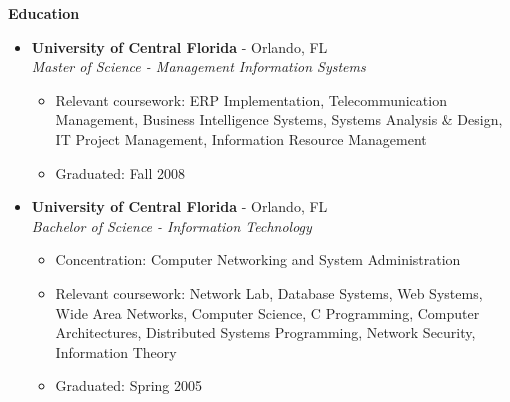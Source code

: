 \documentclass[10pt,oneside]{article}
\newenvironment{ressection}[1]{
	\vspace{4pt}
	\textbf{\selectfont\normalsize#1}
	\begin{itemize}
	\vspace{3pt}
}{
	\end{itemize}
}
\newcommand{\resitem}[1]{
	\vspace{-4pt}
	\item \begin{flushleft} #1 \end{flushleft}
}
\newcommand{\ressubitem}[1]{
	\vspace{-1pt}
	\item \begin{flushleft} #1 \end{flushleft}
}
\newcommand{\resbigitem}[3]{
	\vspace{-5pt}
	\item
	\textbf{#1} - #2 \\
	\textit{#3}
}
\newenvironment{ressubsec}[3]{
	\resbigitem{#1}{#2}{#3}
	\vspace{-2pt}
	\begin{itemize}
}{
	\end{itemize}
}
\begin{document}
\begin{ressection}{Education}

	\begin{ressubsec}{University of Central Florida}{Orlando, FL}{Master of Science - Management Information Systems}

		\ressubitem{Relevant coursework: ERP Implementation, Telecommunication Management, Business Intelligence Systems, Systems Analysis \& Design, IT Project Management, Information Resource Management}

		\ressubitem{Graduated: Fall 2008}

	\end{ressubsec}

	\begin{ressubsec}{University of Central Florida}{Orlando, FL}{Bachelor of Science - Information Technology}

		\ressubitem{Concentration: Computer Networking and System Administration}
		\ressubitem{Relevant coursework: Network Lab, Database Systems, Web Systems, Wide Area Networks, Computer Science, C Programming, Computer Architectures, Distributed Systems Programming, Network Security, Information Theory}

		\ressubitem{Graduated: Spring 2005}

	\end{ressubsec}

\end{ressection}



	






\end{document}

